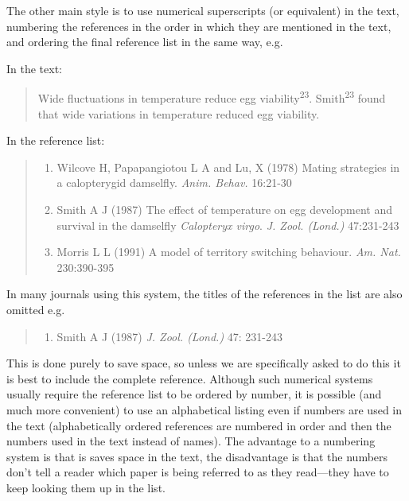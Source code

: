 \documentclass[
]{book}
\providecommand{\tightlist}{%
  \setlength{\itemsep}{0pt}\setlength{\parskip}{0pt}}
\begin{document}
The other main style is to use numerical superscripts (or equivalent) in the text, numbering the references in the order in which they are mentioned in the text, and ordering the final reference list in the same way, e.g.

In the text:

\begin{quote}
Wide fluctuations in temperature reduce egg viability\textsuperscript{23}. Smith\textsuperscript{23} found that wide variations in temperature reduced egg viability.
\end{quote}

In the reference list:

\begin{quote}
\begin{enumerate}
\def\labelenumi{\arabic{enumi}.}
\setcounter{enumi}{21}
\tightlist
\item
  Wilcove H, Papapangiotou L A and Lu, X (1978) Mating strategies in a calopterygid damselfly. \emph{Anim. Behav.} 16:21-30
\item
  Smith A J (1987) The effect of temperature on egg development and survival in the damselfly \emph{Calopteryx virgo}. \emph{J. Zool. (Lond.)} 47:231-243
\item
  Morris L L (1991) A model of territory switching behaviour. \emph{Am. Nat.} 230:390-395
\end{enumerate}
\end{quote}

In many journals using this system, the titles of the references in the list are also omitted e.g.

\begin{quote}
\begin{enumerate}
\def\labelenumi{\arabic{enumi}.}
\setcounter{enumi}{22}
\tightlist
\item
  Smith A J (1987)\textit{ J. Zool. (Lond.)} 47: 231-243
\end{enumerate}
\end{quote}

This is done purely to save space, so unless we are specifically asked to do this it is best to include the complete reference. Although such numerical systems usually require the reference list to be ordered by number, it is possible (and much more convenient) to use an alphabetical listing even if numbers are used in the text (alphabetically ordered references are numbered in order and then the numbers used in the text instead of names). The advantage to a numbering system is that is saves space in the text, the disadvantage is that the numbers don't tell a reader which paper is being referred to as they read---they have to keep looking them up in the list.
\end{document}

